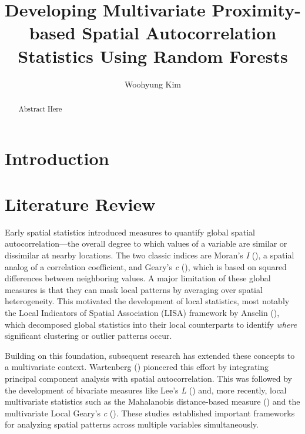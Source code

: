 \documentclass[
  a4paper,
  12pt]{article}
\title{Developing Multivariate Proximity-based Spatial Autocorrelation
Statistics Using Random Forests}
\author{Woohyung Kim}
\date{}
\begin{document}
\maketitle
\begin{abstract}
Abstract Here
\end{abstract}

\section{Introduction}\label{introduction}

\section{Literature Review}\label{literature-review}

Early spatial statistics introduced measures to quantify global spatial
autocorrelation---the overall degree to which values of a variable are
similar or dissimilar at nearby locations. The two classic indices are
Moran's \emph{I} (), a spatial
analog of a correlation coefficient, and Geary's \emph{c}
(), which is based on squared
differences between neighboring values. A major limitation of these
global measures is that they can mask local patterns by averaging over
spatial heterogeneity. This motivated the development of local
statistics, most notably the Local Indicators of Spatial Association
(LISA) framework by Anselin (), which
decomposed global statistics into their local counterparts to identify
\emph{where} significant clustering or outlier patterns occur.

Building on this foundation, subsequent research has extended these
concepts to a multivariate context. Wartenberg
() pioneered this effort by
integrating principal component analysis with spatial autocorrelation.
This was followed by the development of bivariate measures like Lee's
\emph{L} () and, more recently,
local multivariate statistics such as the Mahalanobis distance-based
measure () and the multivariate Local
Geary's \emph{c} (). These
studies established important frameworks for analyzing spatial patterns
across multiple variables simultaneously.
\end{document}
